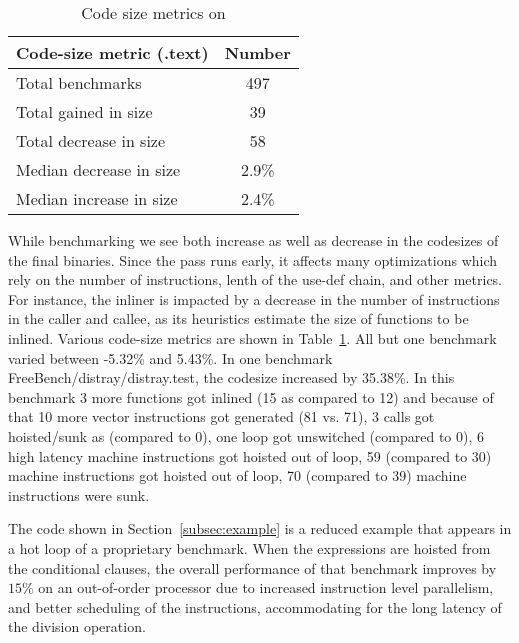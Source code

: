 \documentclass{sig-alternate}
\begin{document}
\begin{table}[h!]
  \begin{center}
    \begin{tabular}{|l|c|}
      \hline
      Code-size metric  (.text)                   & Number   \\\hline
      Total  benchmarks                           & 497      \\\hline
      Total  gained in size                       & 39       \\\hline
      Total  decrease in size                     & 58       \\\hline
      Median decrease in size                     & 2.9\%    \\\hline
      Median increase in size                     & 2.4\%    \\\hline
    \end{tabular}
  \end{center}
  \caption{Code size metrics on \LLVMTestSuite{}}
  \label{tab:code-size}
\end{table}

While benchmarking \LLVMTestSuite{} we see both increase as well as decrease in
the codesizes of the final binaries. Since the pass runs early, it affects many
optimizations which rely on the number of instructions, lenth of the use-def
chain, and other metrics. For instance, the inliner is impacted by a decrease in
the number of instructions in the caller and callee, as its heuristics estimate
the size of functions to be inlined. Various code-size metrics are shown in
Table~\ref{tab:code-size}. All but one benchmark varied between -5.32\% and
5.43\%.  In one benchmark FreeBench/distray/distray.test, the codesize increased
by 35.38\%. In this benchmark 3 more functions got inlined (15 as compared to
12) and because of that 10 more vector instructions got generated (81 vs. 71), 3
calls got hoisted/sunk as (compared to 0), one loop got unswitched (compared to
0), 6 high latency machine instructions got hoisted out of loop, 59 (compared to
30) machine instructions got hoisted out of loop, 70 (compared to 39) machine
instructions were sunk.

The code shown in Section~\ref{subsec:example} is a reduced example that appears
in a hot loop of a proprietary benchmark.  When the expressions are hoisted from
the conditional clauses, the overall performance of that benchmark improves by
$15\%$ on an out-of-order processor due to increased instruction level
parallelism, and better scheduling of the instructions, accommodating for the
long latency of the division operation.
\end{document}
